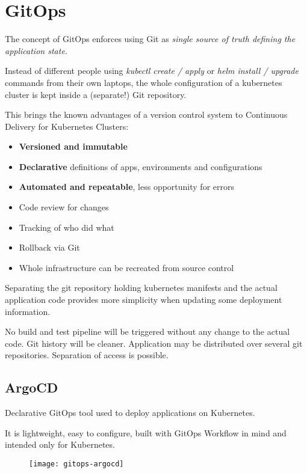 \section{GitOps}

The concept of GitOps enforces using Git as \emph{single source of truth defining the application state.}

Instead of different people using \emph{kubectl create / apply} or \emph{helm install / upgrade} commands from their own laptops, 
the whole configuration of a kubernetes cluster is kept inside a (separate!) Git repository.

This brings the known advantages of a version control system to Continuous Delivery for Kubernetes Clusters:

\begin{itemize}
    \item \textbf{Versioned and immutable}
    \item \textbf{Declarative} definitions of apps, environments and configurations
    \item \textbf{Automated and repeatable}, less opportunity for errors
    \item Code review for changes
    \item Tracking of who did what
    \item Rollback via Git
    \item Whole infrastructure can be recreated from source control
\end{itemize}

Separating the git repository holding kubernetes manifests and the actual application code provides more simplicity when updating some deployment information.

No build and test pipeline will be triggered without any change to the actual code.
Git history will be cleaner.
Application may be distributed over several git repositories.
Separation of access is possible.

\subsection{ArgoCD}
Declarative GitOps tool used to deploy applications on Kubernetes. 

It is lightweight, easy to configure, built with GitOps Workflow in mind and intended only for Kubernetes.

\begin{figure}[h]
    \centering
    \texttt{[image: gitops-argocd]}
\end{figure}

